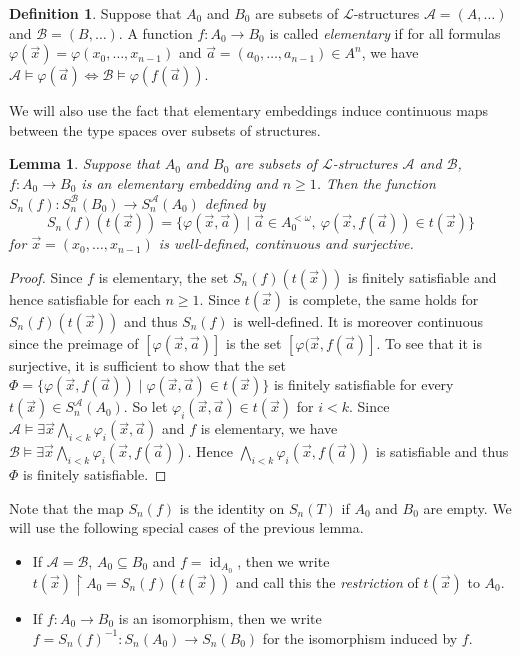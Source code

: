 \documentclass[10pt]{amsart}
\renewcommand{\L}{\mathcal{L}}
\newcommand{\id}{\operatorname{id}}
\renewcommand{\AA}{\mathcal{A}}
\newcommand{\BB}{\mathcal{B}}
\newtheorem{lemma}[theorem]{Lemma}
\theoremstyle{definition}
\newtheorem{definition}[theorem]{Definition}
\theoremstyle{remark}
\begin{document}
\begin{definition} 
Suppose that $A_0$ and $B_0$ are subsets of $\L$-structures $\AA=(A,\dots)$ and $\BB=(B,\dots)$. A function $f\colon A_0\rightarrow B_0$ is called \emph{elementary} if 
for all formulas $\varphi(\vec{x})=\varphi(x_0,\dots,x_{n-1})$ and $\vec{a}=(a_0,\dots,a_{n-1})\in A^n$, we have $\AA\models \varphi(\vec{a}) \Longleftrightarrow \BB\models \varphi(f(\vec{a}))$. 
\end{definition} 

We will also use the fact that elementary embeddings induce continuous maps between the type spaces over subsets of structures. 

\begin{lemma} \label{induced maps on type spaces} 
Suppose that $A_0$ and $B_0$ are subsets of $\L$-structures $\AA$ and $\BB$, $f\colon A_0\rightarrow B_0$ is an elementary embedding and $n\geq 1$. Then the function $S_n(f)\colon S_n^\BB(B_0)\rightarrow S_n^\AA(A_0)$ defined by 
$$S_n(f)(t(\vec{x}))=\{\varphi(\vec{x},\vec{a})\mid \vec{a}\in A_0^{<\omega},\ \varphi(\vec{x},f(\vec{a}))\in t(\vec{x})\}$$ 
for $\vec{x}=(x_0,\dots,x_{n-1})$ is well-defined, continuous and surjective. 
\end{lemma} 
\begin{proof} 
Since $f$ is elementary, the set $S_n(f)(t(\vec{x}))$ is finitely satisfiable and hence satisfiable for each $n\geq1$. Since $t(\vec{x})$ is complete, the same holds for $S_n(f)(t(\vec{x}))$ and thus $S_n(f)$ is well-defined. It is moreover continuous since the preimage of $[\varphi(\vec{x},\vec{a})]$ is the set $[\varphi(\vec{x},f(\vec{a})]$. To see that it is surjective, it is sufficient to show that the set $\Phi=\{\varphi(\vec{x},f(\vec{a}))\mid \varphi(\vec{x},\vec{a})\in t(\vec{x})\}$ is finitely satisfiable for every $t(\vec{x})\in S_n^\AA(A_0)$. So let $\varphi_i(\vec{x},\vec{a})\in t(\vec{x})$ for $i<k$. Since $\AA\models \exists \vec{x} \bigwedge_{i<k}\varphi_i(\vec{x},\vec{a})$ and $f$ is elementary, we have $\BB\models \exists \vec{x} \bigwedge_{i<k}\varphi_i(\vec{x},f(\vec{a}))$. Hence $\bigwedge_{i<k}\varphi_i(\vec{x},f(\vec{a}))$ is satisfiable and thus $\Phi$ is finitely satisfiable. 
\end{proof} 

Note that the map $S_n(f)$ is the identity on $S_n(T)$ if $A_0$ and $B_0$ are empty. We will use the following special cases of the previous lemma. 
\begin{itemize} 
\item 
If  $\AA=\BB$, $A_0\subseteq B_0$ and $f=\id_{A_0}$, then we write $t(\vec{x}){\upharpoonright}A_0=S_n(f)(t(\vec{x}))$ and call this the \emph{restriction} of $t(\vec{x})$ to $A_0$.
\item 
If $f\colon A_0\rightarrow B_0$ is an isomorphism, then we write $f=S_n(f)^{-1}\colon S_n(A_0)\rightarrow S_n(B_0)$ for the isomorphism induced by $f$. 
\end{itemize} 
\end{document}

